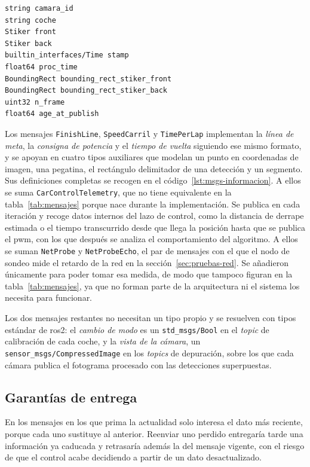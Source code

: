 \begin{lstlisting}[style=codigo, float=tbp, language=rosmsg, caption={Definición del mensaje \texttt{CarLocation}}, label={lst:msg-carlocation}]
string camara_id
string coche
Stiker front
Stiker back
builtin_interfaces/Time stamp
float64 proc_time
BoundingRect bounding_rect_stiker_front
BoundingRect bounding_rect_stiker_back
uint32 n_frame
float64 age_at_publish
\end{lstlisting}

Los mensajes \texttt{FinishLine}, \texttt{SpeedCarril} y \texttt{TimePerLap} implementan la \emph{línea de meta}, la \emph{consigna de potencia} y el \emph{tiempo de vuelta} siguiendo ese mismo formato, y se apoyan en cuatro tipos auxiliares que modelan un punto en coordenadas de imagen, una pegatina, el rectángulo delimitador de una detección y un segmento. Sus definiciones completas se recogen en el código~\ref{lst:msgs-informacion}. A ellos se suma \texttt{CarControlTelemetry}, que no tiene equivalente en la tabla~\ref{tab:mensajes} porque nace durante la implementación. Se publica en cada iteración y recoge datos internos del lazo de control, como la distancia de derrape estimada o el tiempo transcurrido desde que llega la posición hasta que se publica el \gls{pwm}, con los que después se analiza el comportamiento del algoritmo. A ellos se suman \texttt{NetProbe} y \texttt{NetProbeEcho}, el par de mensajes con el que el nodo de sondeo mide el retardo de la red en la sección~\ref{sec:pruebas-red}. Se añadieron únicamente para poder tomar esa medida, de modo que tampoco figuran en la tabla~\ref{tab:mensajes}, ya que no forman parte de la arquitectura ni el sistema los necesita para funcionar.

Los dos mensajes restantes no necesitan un tipo propio y se resuelven con tipos estándar de \gls{ros2}: el \emph{cambio de modo} es un \texttt{std\_msgs/Bool} en el \emph{topic} de calibración de cada coche, y la \emph{vista de la cámara}, un \texttt{sensor\_msgs/CompressedImage} en los \emph{topics} de depuración, sobre los que cada cámara publica el fotograma procesado con las detecciones superpuestas.

\subsection{Garantías de entrega}
\label{subsec:garantia-entrega}

En los mensajes en los que prima la actualidad solo interesa el dato más reciente, porque cada uno sustituye al anterior. Reenviar uno perdido entregaría tarde una información ya caducada y retrasaría además la del mensaje vigente, con el riesgo de que el control acabe decidiendo a partir de un dato desactualizado.

